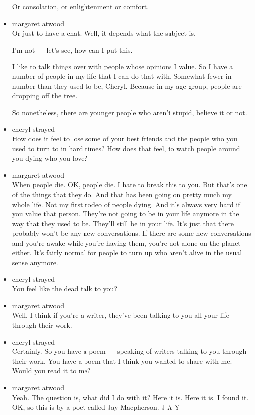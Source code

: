 \begin{itemize}
  Or consolation, or enlightenment or comfort.
\item
  margaret atwood\\
  Or just to have a chat. Well, it depends what the subject is.

  I'm not --- let's see, how can I put this.

  I like to talk things over with people whose opinions I value. So I
  have a number of people in my life that I can do that with. Somewhat
  fewer in number than they used to be, Cheryl. Because in my age group,
  people are dropping off the tree.

  So nonetheless, there are younger people who aren't stupid, believe it
  or not.
\item
  cheryl strayed\\
  How does it feel to lose some of your best friends and the people who
  you used to turn to in hard times? How does that feel, to watch people
  around you dying who you love?
\item
  margaret atwood\\
  When people die. OK, people die. I hate to break this to you. But
  that's one of the things that they do. And that has been going on
  pretty much my whole life. Not my first rodeo of people dying. And
  it's always very hard if you value that person. They're not going to
  be in your life anymore in the way that they used to be. They'll still
  be in your life. It's just that there probably won't be any new
  conversations. If there are some new conversations and you're awake
  while you're having them, you're not alone on the planet either. It's
  fairly normal for people to turn up who aren't alive in the usual
  sense anymore.
\item
  cheryl strayed\\
  You feel like the dead talk to you?
\item
  margaret atwood\\
  Well, I think if you're a writer, they've been talking to you all your
  life through their work.
\item
  cheryl strayed\\
  Certainly. So you have a poem --- speaking of writers talking to you
  through their work. You have a poem that I think you wanted to share
  with me. Would you read it to me?
\item
  margaret atwood\\
  Yeah. The question is, what did I do with it? Here it is. Here it is.
  I found it. OK, so this is by a poet called Jay Macpherson. J-A-Y

\end{itemize}
